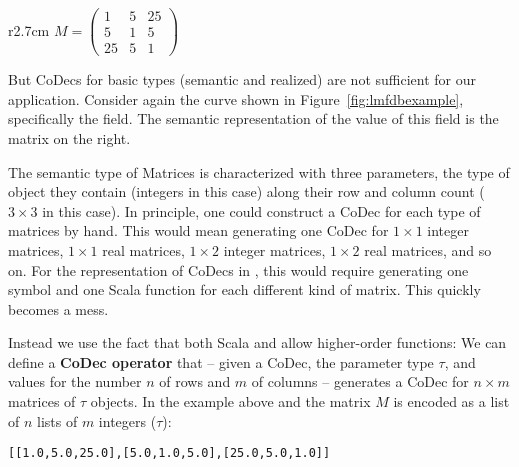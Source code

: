 \begin{wrapfigure}r{2.7cm}\vspace*{-2em}
$M = \left(
    \begin{array}{ccc}
      1 & 5 & 25 \\
      5 & 1 & 5 \\
      25 & 5 & 1 \end{array} 
  \right)$\vspace*{-1em}
\end{wrapfigure}
But CoDecs for basic types (semantic and realized) are not sufficient for our application.
Consider again the  curve shown in Figure~\ref{fig:lmfdbexample}, specifically the  field. 
The semantic representation of the value of this field is the matrix on the right.

The semantic type of Matrices is characterized with three parameters, the type of object they contain (integers in this case) along their row and column count ($3 \times 3$ in this case). 
In principle, one could construct a CoDec for each type of matrices by hand. 
This would mean generating one CoDec for $1 \times 1$ integer matrices, $1 \times 1$ real matrices, $1 \times 2$ integer matrices, $1 \times 2$ real matrices, and so on. 
For the representation of CoDecs in \mmt, this would require generating one symbol and one Scala function for each different kind of matrix. 
This quickly becomes a mess.

Instead we use the fact that both Scala and \ommt allow higher-order functions: 
We can define a \textbf{CoDec operator} that -- given a CoDec, the parameter type $\tau$, and values for the number $n$ of rows and $m$ of columns --  generates a CoDec for $n\times m$ matrices of $\tau$ objects. 
In the example above and the matrix $M$ is encoded as a list of $n$ lists of $m$ integers ($\tau$):
\begin{lstlisting}[]
[[1.0,5.0,25.0],[5.0,1.0,5.0],[25.0,5.0,1.0]]
\end{lstlisting}


